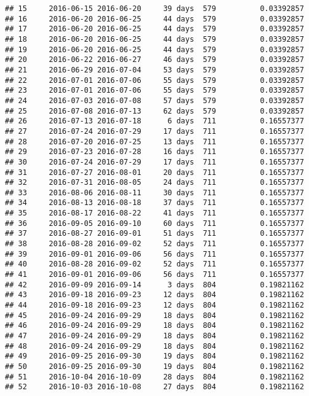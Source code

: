 \documentclass[]{article}
\begin{document}
\begin{verbatim}
## 15     2016-06-15 2016-06-20     39 days  579          0.03392857
## 16     2016-06-20 2016-06-25     44 days  579          0.03392857
## 17     2016-06-20 2016-06-25     44 days  579          0.03392857
## 18     2016-06-20 2016-06-25     44 days  579          0.03392857
## 19     2016-06-20 2016-06-25     44 days  579          0.03392857
## 20     2016-06-22 2016-06-27     46 days  579          0.03392857
## 21     2016-06-29 2016-07-04     53 days  579          0.03392857
## 22     2016-07-01 2016-07-06     55 days  579          0.03392857
## 23     2016-07-01 2016-07-06     55 days  579          0.03392857
## 24     2016-07-03 2016-07-08     57 days  579          0.03392857
## 25     2016-07-08 2016-07-13     62 days  579          0.03392857
## 26     2016-07-13 2016-07-18      6 days  711          0.16557377
## 27     2016-07-24 2016-07-29     17 days  711          0.16557377
## 28     2016-07-20 2016-07-25     13 days  711          0.16557377
## 29     2016-07-23 2016-07-28     16 days  711          0.16557377
## 30     2016-07-24 2016-07-29     17 days  711          0.16557377
## 31     2016-07-27 2016-08-01     20 days  711          0.16557377
## 32     2016-07-31 2016-08-05     24 days  711          0.16557377
## 33     2016-08-06 2016-08-11     30 days  711          0.16557377
## 34     2016-08-13 2016-08-18     37 days  711          0.16557377
## 35     2016-08-17 2016-08-22     41 days  711          0.16557377
## 36     2016-09-05 2016-09-10     60 days  711          0.16557377
## 37     2016-08-27 2016-09-01     51 days  711          0.16557377
## 38     2016-08-28 2016-09-02     52 days  711          0.16557377
## 39     2016-09-01 2016-09-06     56 days  711          0.16557377
## 40     2016-08-28 2016-09-02     52 days  711          0.16557377
## 41     2016-09-01 2016-09-06     56 days  711          0.16557377
## 42     2016-09-09 2016-09-14      3 days  804          0.19821162
## 43     2016-09-18 2016-09-23     12 days  804          0.19821162
## 44     2016-09-18 2016-09-23     12 days  804          0.19821162
## 45     2016-09-24 2016-09-29     18 days  804          0.19821162
## 46     2016-09-24 2016-09-29     18 days  804          0.19821162
## 47     2016-09-24 2016-09-29     18 days  804          0.19821162
## 48     2016-09-24 2016-09-29     18 days  804          0.19821162
## 49     2016-09-25 2016-09-30     19 days  804          0.19821162
## 50     2016-09-25 2016-09-30     19 days  804          0.19821162
## 51     2016-10-04 2016-10-09     28 days  804          0.19821162
## 52     2016-10-03 2016-10-08     27 days  804          0.19821162

\end{verbatim}
\end{document}
